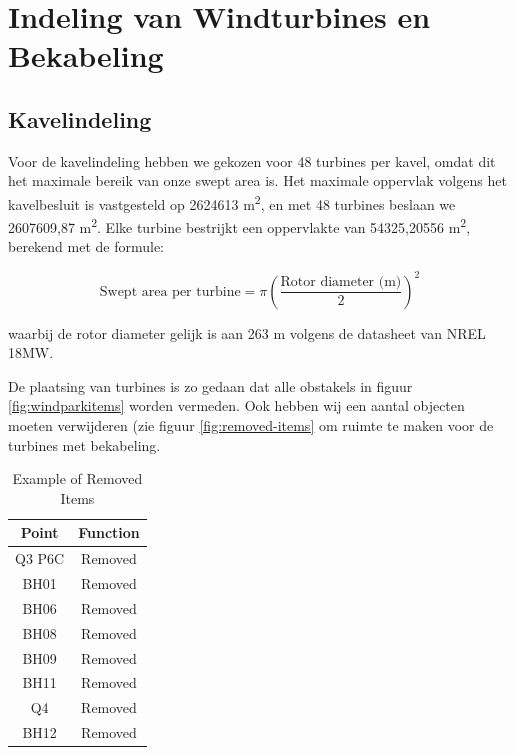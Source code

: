 \section{Indeling van Windturbines en Bekabeling}
\subsection{Kavelindeling}
Voor de kavelindeling hebben we gekozen voor 48 turbines per kavel, omdat dit het maximale bereik van onze swept area is. Het maximale oppervlak volgens het kavelbesluit is vastgesteld op 2624613 m\textsuperscript{2}, en met 48 turbines beslaan we 2607609,87 m\textsuperscript{2}. Elke turbine bestrijkt een oppervlakte van 54325,20556 m\textsuperscript{2}, berekend met de formule:

\begin{equation} \label{eq:25}
\text{{Swept area per turbine}} = \pi \left(\frac{{\text{{Rotor diameter (m)}}}}{2}\right)^2
\end{equation}

waarbij de rotor diameter gelijk is aan 263 m volgens de datasheet van NREL 18MW.

De plaatsing van turbines is zo gedaan dat alle obstakels in figuur \ref{fig:windparkitems} worden vermeden. Ook hebben wij een aantal objecten moeten verwijderen (zie figuur \ref{fig:removed-items} om ruimte te maken voor de turbines met bekabeling.
\begin{table}[h]
    \centering
    \begin{tabular}{|c|c|}
        \hline
        \textbf{Point} & \textbf{Function} \\
        \hline
        Q3 P6C & Removed \\
        \hline
        BH01 & Removed \\
        \hline
        BH06 & Removed \\
        \hline
        BH08 & Removed \\
        \hline
        BH09 & Removed \\
        \hline
        BH11 & Removed \\
        \hline
        Q4 & Removed \\
        \hline
        BH12 & Removed \\
        \hline
    \end{tabular}
    \caption{Example of Removed Items}
    \label{tab:removed-items}
\end{table}

